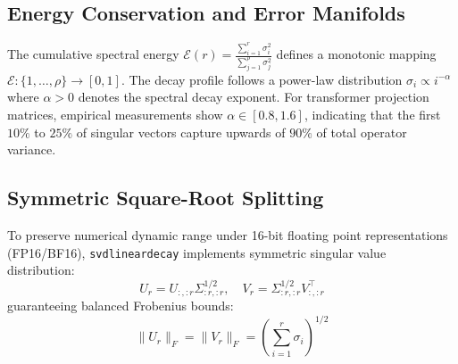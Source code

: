 \subsection{Energy Conservation and Error Manifolds}
The cumulative spectral energy $\mathcal{E}(r) = \frac{\sum_{i=1}^r \sigma_i^2}{\sum_{j=1}^\rho \sigma_j^2}$ defines a monotonic mapping $\mathcal{E}: \{1, \dots, \rho\} \to [0, 1]$. The decay profile follows a power-law distribution $\sigma_i \propto i^{-\alpha}$ where $\alpha > 0$ denotes the spectral decay exponent. For transformer projection matrices, empirical measurements show $\alpha \in [0.8, 1.6]$, indicating that the first $10\%$ to $25\%$ of singular vectors capture upwards of $90\%$ of total operator variance.

\subsection{Symmetric Square-Root Splitting}
To preserve numerical dynamic range under 16-bit floating point representations (FP16/BF16), \texttt{svdlineardecay} implements symmetric singular value distribution:
\[
U_r = U_{:, :r} \Sigma_{:r, :r}^{1/2}, \quad V_r = \Sigma_{:r, :r}^{1/2} V_{:, :r}^\top
\]
guaranteeing balanced Frobenius bounds:
\[
\|U_r\|_F = \|V_r\|_F = \left( \sum_{i=1}^{r} \sigma_i \right)^{1/2}
\]

